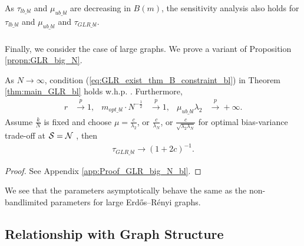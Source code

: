{As $\tau_{lb\_bl}$ and $\mu_{ub\_bl}$ are decreasing in $B(m)$, the sensitivity analysis also holds for $\tau_{lb\_bl}$ and $\mu_{ub\_bl}$ and $\tau_{GLR\_bl}$.
\fi

\subsubsection{}
Finally, we consider the case of large graphs. We prove a variant of Proposition \ref{propn:GLR_big_N}.
\begin{propn}
\label{propn:GLR_big_N_bl}
As $N \to \infty$, condition (\ref{eq:GLR_exist_thm_B_constraint_bl}) in Theorem \ref{thm:main_GLR_bl} holds w.h.p. . Furthermore,
\begin{align}
        r &\overset{p}{\to} 1, &
        {m_{opt\_bl}}\cdot{{N}}^{-\frac{1}{2}} &\overset{p}{\to} 1, &
    \mu_{ub\_bl}\lambda_{2} &\overset{p}{\to} +\infty.
\end{align}
    Assume $\frac{k}{N}$ is fixed and choose $\mu = \frac{c}{\lambda_{2}}$,  or $\frac{c}{\lambda_{N}}$, or $\frac{c}{\sqrt{\lambda_{2}\lambda_{N}} }$ for optimal bias-variance trade-off 
 at $\mathcal{S} = \mathcal{N}$ \cite{chen2017GLRbias}, then
    \begin{align}
        \tau_{GLR\_bl} \to (1+2c)^{-1}.
    \end{align}
\end{propn}
\begin{proof}
    See Appendix \ref{app:Proof_GLR_big_N_bl}.
\end{proof}

{\color{black} We see that the parameters asymptotically behave the same as the non-bandlimited parameters for large Erdős–Rényi graphs.}

\subsection{{\color{blue}Relationship with Graph Structure}}

}
